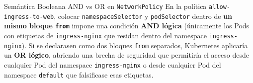 \begin{warnbox}{Semántica Booleana AND vs OR en \texttt{NetworkPolicy}}
En la política \texttt{allow-ingress-to-web}, colocar \texttt{namespaceSelector} y \texttt{podSelector} dentro de \textbf{un mismo bloque \texttt{from}} impone una condición \textbf{AND lógica} (únicamente los Pods con etiquetas de \texttt{ingress-nginx} que residan dentro del namespace \texttt{ingress-nginx}). Si se declarasen como dos bloques \texttt{from} separados, Kubernetes aplicaría un \textbf{OR lógico}, abriendo una brecha de seguridad que permitiría el acceso desde cualquier Pod del namespace \texttt{ingress-nginx} o desde cualquier Pod del namespace \texttt{default} que falsificase esas etiquetas.
\end{warnbox}
